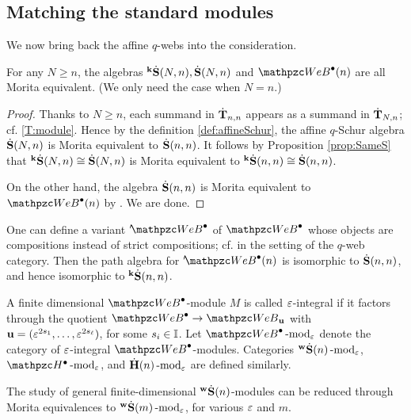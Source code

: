 \subsection{Matching the standard modules}

We now bring back the affine $q$-webs into the consideration. 

\begin{proposition}
\label{prop:Morita}
    For any $N\ge n$, the algebras ${}^{\bold{k}}\dot{\bold{S}}(N,n), \dot{\bf S}(N,n)$ and $\qAW(n)$ are all Morita equivalent. (We only need the case when $N=n$.)
\end{proposition}

\begin{proof}
Thanks to $N\ge n$, each summand in $\dot{\mathbf{T}}_{n,n}$ appears as a summand in $\dot{\mathbf{T}}_{N,n}$; cf. \eqref{T:module}. Hence by the definition \eqref{def:affineSchur}, the affine $q$-Schur algebra $\dot{\bf S}(N,n)$ is Morita equivalent to $\dot{\bf S}(n,n)$. It follows by Proposition \ref{prop:SameS} that ${}^{\bold{k}}\dot{\bold{S}}(N,n)\cong \dot{\bf S}(N,n)$ is Morita equivalent to ${}^{\bold{k}}\dot{\bold{S}}(n,n) \cong \dot{\bf S}(n,n)$.

On the other hand, the algebra $\dot{\bf S}(n,n)$ is Morita equivalent to $\qAW(n)$ by \cite[Proposition 4.18]{SSW25}. We are done. 
\end{proof}

\begin{rem}
\label{rem:composition}
    One can define a variant $'\!\qAW$ of $\qAW$ whose objects are compositions instead of strict compositions; cf. \cite{Bru25} in the setting of the $q$-web category. Then the path algebra for $'\!\qAW(n)$ is isomorphic to $\dot{\bf S}(n,n)$, and hence isomorphic to ${}^{\bold{k}}\dot{\bold{S}}(n,n)$. 
\end{rem}

\begin{definition} 
A finite dimensional $\qAW$-module $M$ is called $\varepsilon$-integral  if it factors through the quotient $\qAW\rightarrow\qW_\bfu$ with $\mathbf{u}=(\varepsilon^{2s_1}, \ldots, \varepsilon^{2s_\ell})$, for some $s_i\in \mathbb{I}$. Let $\qAW\modf_\eps$ denote the category of $\varepsilon$-integral $\qAW$-modules.  Categories ${}^{\bold{w}}\dot{\bold{S}}(n)\operatorname{-mod}\nolimits_\varepsilon$, $\qAH\modf_\eps$, and $\dot{\bf H}(n)\operatorname{-mod}\nolimits_\varepsilon$ are defined similarly.
\end{definition}

The study of general finite-dimensional ${}^{\bold{w}}\dot{\bold{S}}(n)$-modules can be reduced through Morita equivalences to 
${}^{\bold{w}}\dot{\bold{S}}(m)\operatorname{-mod}\nolimits_\varepsilon$, for various $\varepsilon$ and $m$. 

